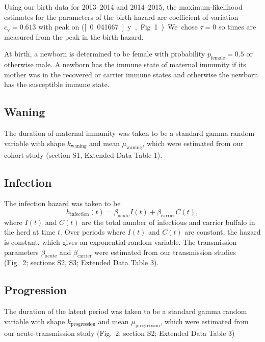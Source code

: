 \documentclass[12pt, USenglish]{article}  %
\begin{document}
Using our birth data for 2013–2014 and 2014–2015, the
maximum-likelihood estimates for the parameters of the birth hazard
are coefficient of variation $c_{\mathrm{v}} = 0.613$ with peak on
{\printyearoff{}} (\unit[0.041667]{y}, Fig.~1). We
chose $\tau = 0$ so times are measured from the peak in the birth
hazard.

At birth, a newborn is determined to be female with probability
$p_{\text{female}} = 0.5$ or otherwise male. A newborn has the immune
state of maternal immunity if its mother was in the recovered or
carrier immune states and otherwise the newborn has the susceptible
immune state.


\subsection{Waning}

The duration of maternal immunity was taken to be a standard gamma
random variable with shape $k_{\text{waning}}$
and mean $\mu_{\text{waning}}$, which were estimated from our cohort
study (section S1, Extended Data Table 1).


\subsection{Infection}

The infection hazard was taken to be
\begin{equation}
  h_{\text{infection}}(t) = \beta_{\text{acute}} I(t) +
  \beta_{\text{carrier}} C(t),
\end{equation}
where $I(t)$ and $C(t)$ are the total number of infectious and carrier
buffalo in the herd at time $t$.  Over periods where $I(t)$ and $C(t)$
are constant, the hazard is constant, which gives an exponential
random variable. The transmission parameters $\beta_{\text{acute}}$
and $\beta_{\text{carrier}}$ were estimated from our transmission
studies (Fig.~2; sections S2, S3; Extended Data Table 3).


\subsection{Progression}

The duration of the latent period was taken to be a standard gamma
random variable with shape $k_{\text{progression}}$
and mean $\mu_{\text{progression}}$, which were estimated from our
acute-transmission study (Fig.~2; section S2; Extended Data Table 3)
\end{document}

